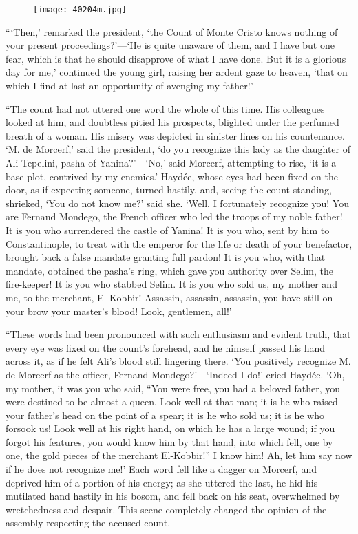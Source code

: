 \begin{figure}[ht]
\texttt{[image: 40204m.jpg]}
\end{figure}

“‘Then,’ remarked the president, ‘the Count of Monte Cristo knows
nothing of your present proceedings?’—‘He is quite unaware of them, and
I have but one fear, which is that he should disapprove of what I have
done. But it is a glorious day for me,’ continued the young girl,
raising her ardent gaze to heaven, ‘that on which I find at last an
opportunity of avenging my father!’

“The count had not uttered one word the whole of this time. His
colleagues looked at him, and doubtless pitied his prospects, blighted
under the perfumed breath of a woman. His misery was depicted in
sinister lines on his countenance. ‘M. de Morcerf,’ said the president,
‘do you recognize this lady as the daughter of Ali Tepelini, pasha of
Yanina?’—‘No,’ said Morcerf, attempting to rise, ‘it is a base plot,
contrived by my enemies.’ Haydée, whose eyes had been fixed on the
door, as if expecting someone, turned hastily, and, seeing the count
standing, shrieked, ‘You do not know me?’ said she. ‘Well, I
fortunately recognize you! You are Fernand Mondego, the French officer
who led the troops of my noble father! It is you who surrendered the
castle of Yanina! It is you who, sent by him to Constantinople, to
treat with the emperor for the life or death of your benefactor,
brought back a false mandate granting full pardon! It is you who, with
that mandate, obtained the pasha’s ring, which gave you authority over
Selim, the fire-keeper! It is you who stabbed Selim. It is you who sold
us, my mother and me, to the merchant, El-Kobbir! Assassin, assassin,
assassin, you have still on your brow your master’s blood! Look,
gentlemen, all!’

“These words had been pronounced with such enthusiasm and evident
truth, that every eye was fixed on the count’s forehead, and he himself
passed his hand across it, as if he felt Ali’s blood still lingering
there. ‘You positively recognize M. de Morcerf as the officer, Fernand
Mondego?’—‘Indeed I do!’ cried Haydée. ‘Oh, my mother, it was you who
said, “You were free, you had a beloved father, you were destined to be
almost a queen. Look well at that man; it is he who raised your
father’s head on the point of a spear; it is he who sold us; it is he
who forsook us! Look well at his right hand, on which he has a large
wound; if you forgot his features, you would know him by that hand,
into which fell, one by one, the gold pieces of the merchant
El-Kobbir!” I know him! Ah, let him say now if he does not recognize
me!’ Each word fell like a dagger on Morcerf, and deprived him of a
portion of his energy; as she uttered the last, he hid his mutilated
hand hastily in his bosom, and fell back on his seat, overwhelmed by
wretchedness and despair. This scene completely changed the opinion of
the assembly respecting the accused count.

